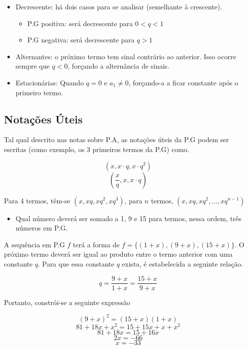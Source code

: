 \begin{tcolorbox}[colback=LightYellow]
\begin{itemize}
\item Decrescente: há dois casos para se analisar (semelhante à crescente).
      \begin{itemize}
              \item P.G positiva: será decrescente para $0 < q < 1$
              \item P.G negativa: será decrescente para $q > 1$
      \end{itemize}
\end{itemize}
\end{tcolorbox}

\begin{tcolorbox}[colback=LightYellow]
\begin{itemize}
\item Alternantes: o próximo termo tem sinal contrário ao anterior. Isso ocorre sempre que $q < 0$, forçando a alternância de sinais.

\item Estacionárias: Quando $q = 0$ e $a_{1} \neq 0$, forçando-a a ficar constante após o primeiro termo.
\end{itemize}
\end{tcolorbox}

\subsection{Notações Úteis}

Tal qual descrito nas notas sobre P.A, as notações úteis da P.G podem ser escritas (como exemplo, os 3 primeiros termos da P.G) como.

\[\left(x, x\cdot q, x\cdot q^{2}\right)\]
\[\left(\frac{x}{q}, x, x\cdot q\right)\]

Para 4 termos, têm-se $\left(x, xq, xq^{2}, xq^{3}\right)$, para $n$ termos, $\left(x, xq, xq^{2}, \dots, xq^{n - 1}\right)$

\begin{tcolorbox}[colback=LightYellow]
\begin{itemize}
  \item Qual número deverá ser somado a 1, 9 e 15 para termos, nessa ordem, três números em P.G.
\end{itemize}
\end{tcolorbox}

\begin{tcolorbox}[colback=LightYellow]
A sequência em P.G $f$ terá a forma de $f = \{(1 + x), (9 + x), (15 + x)\}$. O próximo termo deverá ser igual ao produto entre o termo anterior com uma constante $q$. Para que essa constante $q$ exista, é estabelecida a seguinte relação.

\[q = \frac{9 + x}{1 + x} = \frac{15 + x}{9 + x}\]

Portanto, constrói-se a seguinte expressão

\end{tcolorbox}
\begin{tcolorbox}[colback=LightYellow]
\[(9 + x)^{2} = (15 + x)(1 + x)\]
\[81 + 18x + x^{2} = 15 + 15x + x + x^{2}\]
\[81 + 18x = 15 + 16x\]
\[2x = -66\]
\[x = -33\]
\end{tcolorbox}

